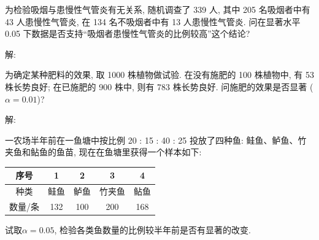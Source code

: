 \documentclass[standard]{ExBook}
\begin{document}
\begin{qitems}
    \begin{bbox}
    \begin{shaded}
        \qitem 
为检验吸烟与患慢性气管炎有无关系, 随机调查了 339 人, 其中 205 名吸烟者中有 43 人患慢性气管炎, 在 134 名不吸烟者中有 13 人患慢性气管炎. 问在显著水平 0.05 下数据是否支持``吸烟者患慢性气管炎的比例较高''这个结论?
    \end{shaded}
    \end{bbox}

\vspace{-5em}

    \begin{bbox}
解: 
    \end{bbox}

\vspace{-5em}

    \begin{bbox}
    \begin{shaded}
        \qitem
为确定某种肥料的效果, 取 1000 株植物做试验. 在没有施肥的 100 株植物中, 有 53 株长势良好; 在已施肥的 900 株中, 则有 783 株长势良好. 问施肥的效果是否显著 ($\alpha=0.01$)?
    \end{shaded}
    \end{bbox}

\vspace{-5em}

    \begin{bbox}
解: 
    \end{bbox}

\vspace{-5em}

    \begin{bbox}
    \begin{shaded}
        \qitem
一农场半年前在一鱼塘中按比例 20 : 15 : 40 : 25 投放了四种鱼: 鲑鱼、鲈鱼、竹夹鱼和鲇鱼的鱼苗, 现在在鱼塘里获得一个样本如下:
\begin{center}
\setlength{\tabcolsep}{34pt}
\begin{tabular}{c|cccc}
\hline
序号 & 1 & 2 & 3 & 4 \\
\hline
种类 & 鲑鱼 & 鲈鱼 & 竹夹鱼 & 鲇鱼 \\
\hline
数量/条 & 132 & 100 & 200 & 168 \\
\hline
\end{tabular}
\end{center}
试取$\alpha=0.05$, 检验各类鱼数量的比例较半年前是否有显著的改变.
    \end{shaded}
    \end{bbox}


\end{qitems}
\end{document}
